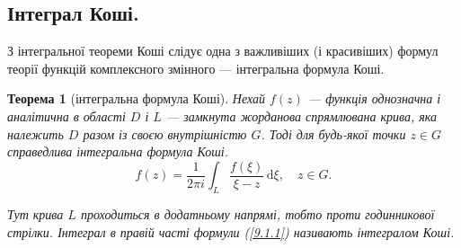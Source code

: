 \documentclass[12pt,fleqn]{article}
\theoremstyle{theorem}
\newtheorem{thm}{Теорема}[section]
\theoremstyle{proof}
\numberwithin{figure}{section}
\numberwithin{equation}{section}
\begin{document}
\subsection{Інтеграл Коші.}\label{9.1}
З інтегральної теореми Коші слідує одна з важливіших (і красивіших) формул теорії функцій комплексного змінного --- інтегральна формула Коші.
\begin{thm}[інтегральна формула Коші]
Нехай $f(z)$ --- функція однозначна і аналітична в області $D$ і $L$ --- замкнута жорданова спрямлювана крива, яка належить $D$ разом із своєю внутрішністю $G$. Тоді для будь-якої точки $z\in G$ справедлива інтегральна формула Коші.
\begin{equation}\label{9.1.1}
f(z)=\frac{1}{2\pi i}\int_{L}\frac{f(\xi)}{\xi - z}\,\mathrm{d}\xi, \quad z\in G.
\end{equation}

Тут крива $L$ проходиться в додатньому напрямі, тобто проти годинникової стрілки. Інтеграл в правій часті формули (\ref{9.1.1}) називають інтегралом Коші.
\end{thm}
\end{document}

